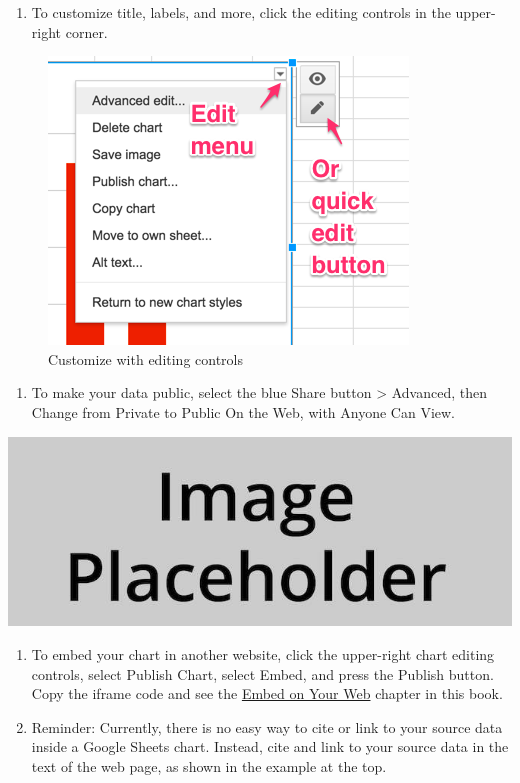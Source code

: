 \documentclass[
  english,
]{book}
\providecommand{\tightlist}{%
  \setlength{\itemsep}{0pt}\setlength{\parskip}{0pt}}
\begin{document}
\begin{enumerate}
\def\labelenumi{\arabic{enumi})}
\setcounter{enumi}{7}
\tightlist
\item
  To customize title, labels, and more, click the editing controls in the upper-right corner.
\end{enumerate}

\begin{figure}
\centering
\includegraphics{images/05-chart/column-edit-chart.png}
\caption{Customize with editing controls}
\end{figure}

\begin{enumerate}
\def\labelenumi{\arabic{enumi})}
\setcounter{enumi}{8}
\tightlist
\item
  To make your data public, select the blue Share button \textgreater{} Advanced, then Change from Private to Public On the Web, with Anyone Can View.
\end{enumerate}

\includegraphics{images/placeholder.jpg}

\begin{enumerate}
\def\labelenumi{\arabic{enumi})}
\setcounter{enumi}{9}
\item
  To embed your chart in another website, click the upper-right chart editing controls, select Publish Chart, select Embed, and press the Publish button. Copy the iframe code and see the \href{embed.html}{Embed on Your Web} chapter in this book.
\item
  Reminder: Currently, there is no easy way to cite or link to your source data inside a Google Sheets chart. Instead, cite and link to your source data in the text of the web page, as shown in the example at the top.
\end{enumerate}
\end{document}
